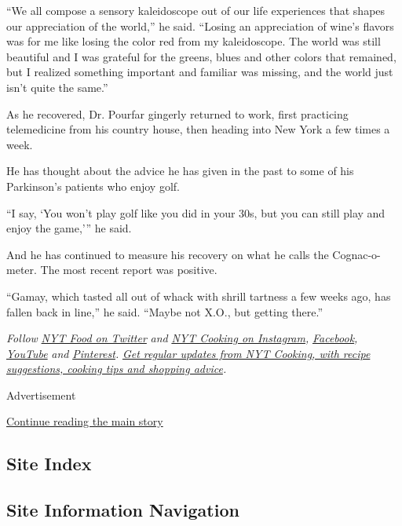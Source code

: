 ``We all compose a sensory kaleidoscope out of our life experiences that
shapes our appreciation of the world,'' he said. ``Losing an
appreciation of wine's flavors was for me like losing the color red from
my kaleidoscope. The world was still beautiful and I was grateful for
the greens, blues and other colors that remained, but I realized
something important and familiar was missing, and the world just isn't
quite the same.''

As he recovered, Dr. Pourfar gingerly returned to work, first practicing
telemedicine from his country house, then heading into New York a few
times a week.

He has thought about the advice he has given in the past to some of his
Parkinson's patients who enjoy golf.

``I say, `You won't play golf like you did in your 30s, but you can
still play and enjoy the game,''' he said.

And he has continued to measure his recovery on what he calls the
Cognac-o-meter. The most recent report was positive.

``Gamay, which tasted all out of whack with shrill tartness a few weeks
ago, has fallen back in line,'' he said. ``Maybe not X.O., but getting
there.''

\emph{Follow} \href{https://twitter.com/nytfood}{\emph{NYT Food on
Twitter}} \emph{and}
\href{https://www.instagram.com/nytcooking/}{\emph{NYT Cooking on
Instagram}}\emph{,}
\href{https://www.facebookcorewwwi.onion/nytcooking/}{\emph{Facebook}}\emph{,}
\href{https://www.youtube.com/nytcooking}{\emph{YouTube}} \emph{and}
\href{https://www.pinterest.com/nytcooking/}{\emph{Pinterest}}\emph{.}
\href{https://www.nytimes3xbfgragh.onion/newsletters/cooking}{\emph{Get
regular updates from NYT Cooking, with recipe suggestions, cooking tips
and shopping advice}}\emph{.}

Advertisement

\protect\hyperlink{after-bottom}{Continue reading the main story}

\hypertarget{site-index}{%
\subsection{Site Index}\label{site-index}}

\hypertarget{site-information-navigation}{%
\subsection{Site Information
Navigation}\label{site-information-navigation}}

